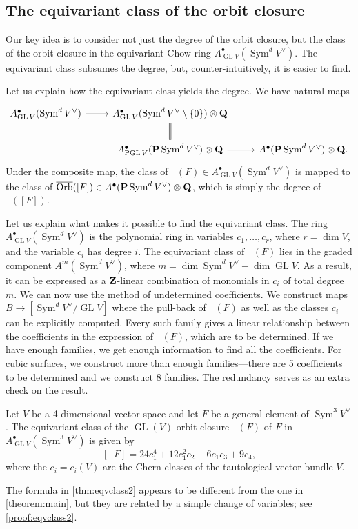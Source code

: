 \documentclass[reqno]{amsart}
\DeclareMathOperator{\Orb}{\overline{Orb}}
\renewcommand{\to}{{\longrightarrow}}
\providecommand {\Z}{{\bf Z}}
\providecommand {\Q}{{\bf Q}}
\renewcommand {\P}{{\bf P}}
\providecommand{\GL}{\operatorname{GL}}
\providecommand{\PGL}{\operatorname{PGL}}
\providecommand{\Sym}{\operatorname{Sym}}
\numberwithin{equation}{section}
\begin{document}
\subsection{The equivariant class of the orbit closure}
Our key idea is to consider not just the degree of the orbit closure,
but the class of the orbit closure in the equivariant Chow ring
$A^{\bullet}_{\GL V}(\Sym^dV^{\vee})$.
The equivariant class subsumes the
degree, but, counter-intuitively, it is easier to find.

Let us explain how the equivariant class yields the degree.
We have natural maps
\[
\begin{tikzcd}
  A^{\bullet}_{\GL V}(\Sym^dV^{\vee}) \ar{r}& A^{\bullet}_{\GL V}(\Sym^d V^{\vee} \setminus
  \{0\}) \otimes \Q \ar[equal]{d}\\
  &A^{\bullet}_{\PGL V}(\P \Sym^dV^{\vee}) \otimes \Q \ar{r}&
  A^{\bullet}(\P \Sym^dV^{\vee}) \otimes \Q.
\end{tikzcd}
\]
Under the composite map, the class of $\Orb(F) \in A^{\bullet}_{\GL
  V}(\Sym^dV^{\vee})$ is mapped to the class of $\Orb([F]) \in
A^{\bullet}(\P \Sym^dV^{\vee}) \otimes \Q$, which is simply the degree of $\Orb([F])$.

Let us explain what makes it possible to find the equivariant
class.  The ring $A^{\bullet}_{\GL V}(\Sym^dV^{\vee})$ is the polynomial ring
in variables $c_1, \dots, c_r$, where $r = \dim V$, and the variable
$c_i$ has degree $i$.  The equivariant class of $\Orb(F)$ lies in the
graded component $A^m(\Sym^dV^{\vee})$, where
$m = \dim \Sym^d V^{\vee} - \dim \GL V$.  As a result, it can be expressed as
a $\Z$-linear combination of monomials in $c_i$ of total degree
$m$. We can now use the method of undetermined coefficients.  We
construct maps $B \to [\Sym^dV^{\vee}/\GL V]$ where the pull-back of
$\Orb(F)$ as well as the classes $c_i$ can be explicitly
computed. Every such family gives a linear relationship between the
coefficients in the expression of $\Orb(F)$, which are to be determined.
If we have enough families, we get enough information to find all the coefficients.
For cubic surfaces, we construct more than enough families---there are 5
coefficients to be determined and we construct 8 families. The redundancy
serves as an extra check on the result.
\begin{theorem}\label{thm:eqvclass2}
  Let $V$ be a 4-dimensional vector space and let $F$ be a general
  element of $\Sym^3 V^{\vee}$.
  The equivariant class of the $\GL(V)$-orbit closure $\Orb(F)$ of $F$
  in $A^{\bullet}_{\GL V}(\Sym^3 V^{\vee})$ is given by
  \[
    [\Orb F] = 24c_1^4 + 12c_1^2c_2 - 6c_1c_3 + 9c_4,
  \]
  where the \(c_i = c_i(V)\) are the Chern classes of the tautological vector
  bundle $V$.
\end{theorem}
The formula in \autoref{thm:eqvclass2} appears to be different from the one
in \autoref{theorem:main}, but they are related by a simple change of
variables; see \autoref{proof:eqvclass2}.
\end{document}
